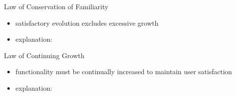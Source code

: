 \begin{frame}{\insertsubsection}
	\begin{fancycolumns}
		\begin{definition}{Law of Conservation of Familiarity\mysource{\lehmanslaws}}
			\begin{itemize}
				\item satisfactory evolution excludes excessive growth %
				\item explanation: 
			\end{itemize}
		\end{definition}
		\begin{example}{}
		\end{example}
		\nextcolumn
		\begin{definition}{Law of Continuing Growth\mysource{\lehmanslaws}}
			\begin{itemize}
				\item functionality must be continually increased to maintain user satisfaction %
				\item explanation: 
			\end{itemize}
		\end{definition}
		\begin{example}{}
		\end{example}
	\end{fancycolumns}
\end{frame}

